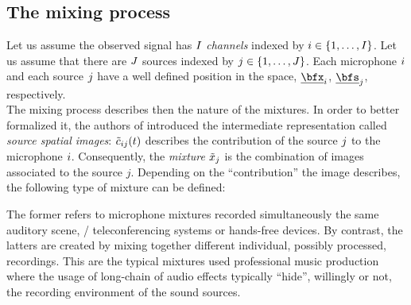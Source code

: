 \subsection{The mixing process}\label{subsec:processing:mixing}
Let us assume the observed signal has $I$ \textit{channels} indexed by $\idxMic \in \kbrace{1,\dots,\numMics}$.
Let us assume that there are $J$ sources indexed by $\idxSrc \in \kbrace{1,\dots,\numSrcs}$.
Each microphone $i$ and each source $j$ have a well defined position in the space, $\positionMicrophone_\idxMic$, $\positionSource_\idxSrc$, respectively.
\\The mixing process describes then the nature of the mixtures.
In order to better formalized it, the authors of  introduced the intermediate representation called \emph{source spatial images}:
$\tilde{c}_{ij}(t)$ describes the contribution of the source $j$ to the microphone $i$.
Consequently, the \textit{mixture} $\tilde{x}_{j}$ is the combination of images associated to the source $j$.
Depending on the ``contribution'' the image describes, the following type of mixture can be defined:

The former refers to microphone mixtures recorded simultaneously the same auditory scene, \eg/ teleconferencing systems or hands-free devices.
By contrast, the latters are created by mixing together different individual, possibly processed, recordings.
This are the typical mixtures used professional music production where the usage of long-chain of audio effects typically ``hide'', willingly or not, the recording environment of the sound sources.

